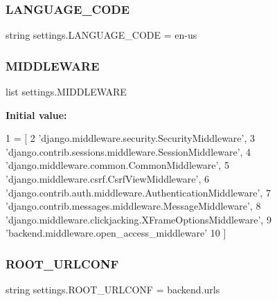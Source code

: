 \subsubsection{\texorpdfstring{L\+A\+N\+G\+U\+A\+G\+E\+\_\+\+C\+O\+DE}{LANGUAGE\_CODE}}
{\footnotesize\ttfamily string settings.\+L\+A\+N\+G\+U\+A\+G\+E\+\_\+\+C\+O\+DE = \textquotesingle{}en-\/us\textquotesingle{}}

\mbox{\label{namespacesettings_ab0b72ef549d1bbaaf4e2bacd7845ed89}} 
\subsubsection{\texorpdfstring{M\+I\+D\+D\+L\+E\+W\+A\+RE}{MIDDLEWARE}}
{\footnotesize\ttfamily list settings.\+M\+I\+D\+D\+L\+E\+W\+A\+RE}

{\bfseries Initial value\+:}
\begin{DoxyCode}
1 =  [
2     \textcolor{stringliteral}{'django.middleware.security.SecurityMiddleware'},
3     \textcolor{stringliteral}{'django.contrib.sessions.middleware.SessionMiddleware'},
4     \textcolor{stringliteral}{'django.middleware.common.CommonMiddleware'},
5     \textcolor{stringliteral}{'django.middleware.csrf.CsrfViewMiddleware'},
6     \textcolor{stringliteral}{'django.contrib.auth.middleware.AuthenticationMiddleware'},
7     \textcolor{stringliteral}{'django.contrib.messages.middleware.MessageMiddleware'},
8     \textcolor{stringliteral}{'django.middleware.clickjacking.XFrameOptionsMiddleware'},
9     \textcolor{stringliteral}{'backend.middleware.open\_access\_middleware'}
10 ]
\end{DoxyCode}
\mbox{\label{namespacesettings_aa0f43ed264268363f2f3d6a7b4372ddc}} 
\subsubsection{\texorpdfstring{R\+O\+O\+T\+\_\+\+U\+R\+L\+C\+O\+NF}{ROOT\_URLCONF}}
{\footnotesize\ttfamily string settings.\+R\+O\+O\+T\+\_\+\+U\+R\+L\+C\+O\+NF = \textquotesingle{}backend.\+urls\textquotesingle{}}

